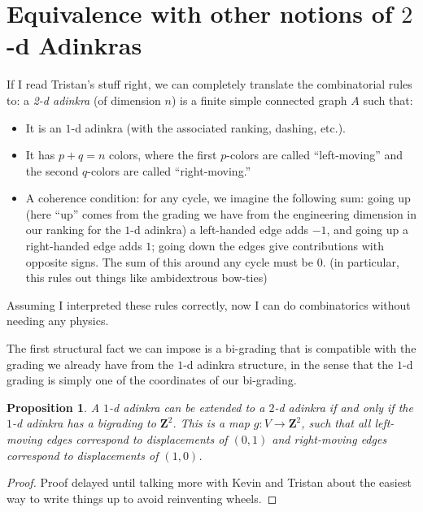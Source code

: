 \documentclass[12pt,twoside,singlespace]{article}
\numberwithin{equation}{section}
\newtheorem{prop}[equation]{Proposition}
\theoremstyle{definition}
\newcommand{\ZZ}{\mathbf{Z}}
\begin{document}
\appendix
\section{Equivalence with other notions of $2$-d Adinkras}


If I read Tristan's stuff right, we can completely translate the combinatorial rules to: a \emph{2-d adinkra} (of dimension $n$) is a finite simple connected graph $A$ such that:
\begin{itemize}
\item It is an $1$-d adinkra (with the associated ranking, dashing, etc.).
\item It has $p + q = n$ colors, where the first $p$-colors are called ``left-moving'' and the second $q$-colors are called ``right-moving.''
\item A coherence condition: for any cycle, we imagine the following sum: going up (here ``up'' comes from the grading we have from the engineering dimension in our ranking for the $1$-d adinkra) a left-handed edge adds $-1$, and going up a right-handed edge adds $1$; going down the edges give contributions with opposite signs. The sum of this around any cycle must be $0$. (in particular, this rules out things like ambidextrous bow-ties)
\end{itemize} 

Assuming I interpreted these rules correctly, now I can do combinatorics without needing any physics.


The first structural fact we can impose is a bi-grading that is compatible with the grading we already have from the $1$-d adinkra structure, in the sense that the $1$-d grading is simply one of the coordinates of our bi-grading.

\begin{prop}
A $1$-d adinkra can be extended to a $2$-d adinkra if and only if the $1$-d adinkra has a \emph{bigrading} to $\ZZ^2$. This is a map $g: V \rightarrow \ZZ^2$, such that all left-moving edges correspond to displacements of $(0, 1)$ and right-moving edges correspond to displacements of $(1, 0)$.
\end{prop}

\begin{proof}
Proof delayed until talking more with Kevin and Tristan about the easiest way to write things up to avoid reinventing wheels.
\end{proof}




\end{document}
